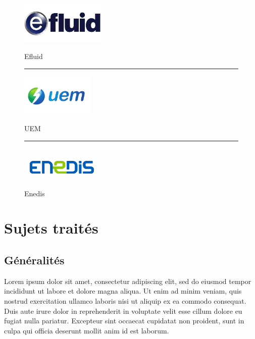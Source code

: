 \documentclass[a4paper, 12pt]{report}
\begin{document}
\begin{figure}
  \begin{center}
    \begin{minipage}{4cm}
      \begin{center}
        \includegraphics[height=2cm]{../res/logo-efluid.jpg}
        \caption{Efluid}
      \end{center}
    \end{minipage}
    \rule{1cm}{0cm}
    \begin{minipage}{4cm}
      \begin{center}
        \includegraphics[height=2cm]{../res/logo-uem.jpg}
        \caption{UEM}
      \end{center}
    \end{minipage}
    \rule{1cm}{0cm}
    \begin{minipage}{4cm}
      \begin{center}
        \includegraphics[height=2cm]{../res/logo-enedis.jpg}
        \caption{Enedis}
      \end{center}
    \end{minipage}
  \end{center}
\end{figure}

\chapter{Sujets traités}

\section{Généralités}

Lorem ipsum dolor sit amet, consectetur adipiscing elit, sed do eiusmod tempor incididunt ut labore et dolore magna aliqua. Ut enim ad minim veniam, quis nostrud exercitation ullamco laboris nisi ut aliquip ex ea commodo consequat. Duis aute irure dolor in reprehenderit in voluptate velit esse cillum dolore eu fugiat nulla pariatur. Excepteur sint occaecat cupidatat non proident, sunt in culpa qui officia deserunt mollit anim id est laborum.
\end{document}
